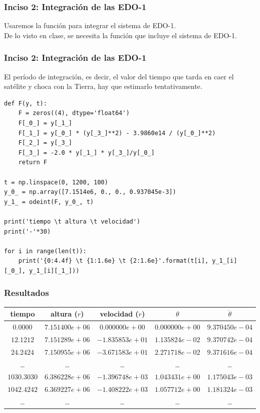 \begin{frame}
\frametitle{Inciso 2: Integración de las EDO-1}
Usaremos la función  para integrar el sistema de EDO-1.
\\
\bigskip
De lo visto en clase, se necesita la función  que incluye el sistema de EDO-1.
\end{frame}
\begin{frame}
\frametitle{Inciso 2: Integración de las EDO-1}
El período de integración, es decir, el valor del tiempo que tarda en caer el satélite y choca con la Tierra, hay que estimarlo tentativamente.
\end{frame}
\begin{frame}
\begin{lstlisting}[caption=Solución con python, style=FormattedNumber, basicstyle=\linespread{1.1}\ttfamily=\small, columns=fullflexible]
def F(y, t):
    F = zeros((4), dtype='float64')
    F[_0_] = y[_1_]
    F[_1_] = y[_0_] * (y[_3_]**2) - 3.9860e14 / (y[_0_]**2)
    F[_2_] = y[_3_]
    F[_3_] = -2.0 * y[_1_] * y[_3_]/y[_0_]
    return F

t = np.linspace(0, 1200, 100)
y_0_ = np.array([7.1514e6, 0., 0., 0.937045e-3])
y_1_ = odeint(F, y_0_, t)

print('tiempo \t altura \t velocidad')
print('-'*30)

for i in range(len(t)):
    print('{0:4.4f} \t {1:1.6e} \t {2:1.6e}'.format(t[i], y_1_[i][_0_], y_1_[i][_1_]))
\end{lstlisting}
\end{frame}
\begin{frame}[fragile]
\frametitle{Resultados}
\fontsize{10}{10}\selectfont
\begin{center}
\hspace*{-1.25cm}
\begin{tabular}{c | c | c | c | c }
tiempo & altura ($r$) & velocidad ($\dot{r}$) & $\theta$ & $\dot{\theta}$ \\ \hline
$0.0000$ & $7.151400e+06$ & $0.000000e+00$ & $0.000000e+00$ & $9.370450e-04$\\ \hline
$12.1212$ & $7.151289e+06$ & $-1.835853e+01$ & $1.135824e-02$ & $9.370742e-04$ \\ \hline
$24.2424$ & $7.150955e+06$ & $-3.671583e+01$ & $2.271718e-02$ & $9.371616e-04$ \\ \hline
\ldots & \ldots & \ldots & \ldots & \ldots \\ \hline
$1030.3030$ & $6.386228e+06$ & $-1.396748e+03$ & $1.043431e+00$ & $1.175043e-03$ \\ \hline
$1042.4242$ & $6.369227e+06$ & $-1.408222e+03$ & $1.057712e+00$ & $1.181324e-03$ \\ \hline
\ldots & \ldots & \ldots & \ldots & \ldots \\ \hline
\end{tabular}
\end{center}
\end{frame}
